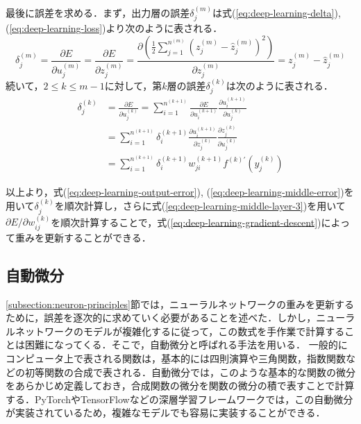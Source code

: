 最後に誤差を求める．まず，出力層の誤差$\delta_j^{(m)}$は式(\ref{eq:deep-learning-delta}), (\ref{eq:deep-learning-loss})より次のように表される．
\begin{equation}
  \delta_j^{(m)} = \frac{\partial E}{\partial u_j^{(m)}} =
  \frac{\partial E}{\partial z_j^{(m)}} =
  \frac{\partial \left( \frac{1}{2} \sum_{j=1}^{n^{(m)}} \left( z_j^{(m)} - \hat{z}_j^{(m)} \right)^2 \right)} {\partial z_j^{(m)}} =
  z_j^{(m)} - \hat{z}_j^{(m)}
  \label{eq:deep-learning-output-error}
\end{equation}
続いて，$2 \leq k \leq m-1$に対して，第$k$層の誤差$\delta_j^{(k)}$は次のように表される．
\begin{equation}
  \begin{split}
  \delta_j^{(k)} &= \frac{\partial E}{\partial u_j^{(k)}} =
  \sum_{i=1}^{n^{(k+1)}} \frac{\partial E}{\partial u_i^{(k+1)}} \frac{\partial u_i^{(k+1)}} {\partial u_j^{(k)}} \\ &=
  \sum_{i=1}^{n^{(k+1)}} \delta_i^{(k+1)} \frac{\partial u_i^{(k+1)}} {\partial z_j^{(k)}} \frac{\partial z_j^{(k)}} {\partial u_j^{(k)}} \\ &=
  \sum_{i=1}^{n^{(k+1)}} \delta_i^{(k+1)} w_{ji}^{(k+1)} f^{(k)\prime}(y_j^{(k)})
  \end{split}
  \label{eq:deep-learning-middle-error}
\end{equation}

以上より，式(\ref{eq:deep-learning-output-error}), (\ref{eq:deep-learning-middle-error})を用いて$\delta_j^{(k)}$を順次計算し，さらに式(\ref{eq:deep-learning-middle-layer-3})を用いて$\partial E / \partial w_{ij}^{(k)}$を順次計算することで，式(\ref{eq:deep-learning-gradient-descent})によって重みを更新することができる．

\subsection{自動微分 \label{subsection:automatic-differentiation}}
\ref{subsection:neuron-principles}節では，ニューラルネットワークの重みを更新するために，誤差を逐次的に求めていく必要があることを述べた．しかし，ニューラルネットワークのモデルが複雑化するに従って，この数式を手作業で計算することは困難になってくる．そこで，自動微分と呼ばれる手法を用いる．
一般的にコンピュータ上で表される関数は，基本的には四則演算や三角関数，指数関数などの初等関数の合成で表される．自動微分では，このような基本的な関数の微分をあらかじめ定義しておき，合成関数の微分を関数の微分の積で表すことで計算する．PyTorchやTensorFlowなどの深層学習フレームワークでは，この自動微分が実装されているため，複雑なモデルでも容易に実装することができる．

